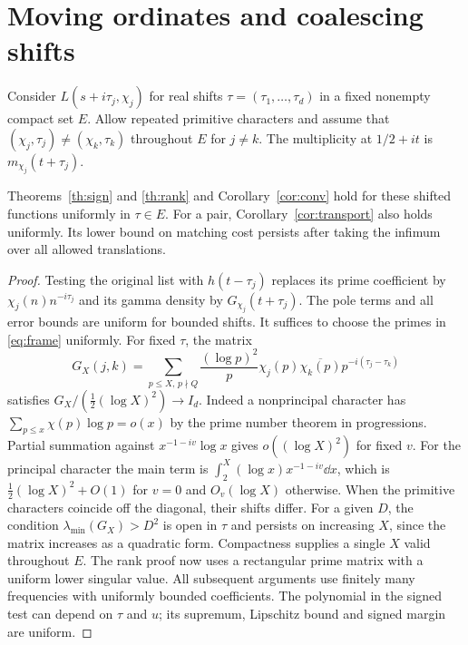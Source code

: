 \section{Moving ordinates and coalescing shifts}\label{sec:moving}

Consider $L(s+i\tau_j,\chi_j)$ for real shifts $\tau=(\tau_1,\ldots,\tau_d)$
in a fixed nonempty compact set $E$. Allow repeated primitive characters
and assume that $(\chi_j,\tau_j)\ne(\chi_k,\tau_k)$ throughout $E$ for
$j\ne k$. The multiplicity at $1/2+it$ is $m_{\chi_j}(t+\tau_j)$.

\begin{theorem}\label{th:moving}
Theorems~\ref{th:sign} and \ref{th:rank} and Corollary~\ref{cor:conv}
hold for these shifted functions uniformly in $\tau\in E$. For a pair,
Corollary~\ref{cor:transport} also holds uniformly. Its lower bound on
matching cost persists after taking the infimum over all allowed translations.
\end{theorem}
\begin{proof}
Testing the original list with $h(t-\tau_j)$ replaces its prime coefficient
by $\chi_j(n)n^{-i\tau_j}$ and its gamma density by $G_{\chi_j}(t+\tau_j)$.
The pole terms and all error bounds are uniform for bounded shifts.
It suffices to choose the primes in \eqref{eq:frame} uniformly.
For fixed $\tau$, the matrix
\[
 G_X(j,k)=\sum_{p\le X,\,p\nmid Q}\frac{(\log p)^2}{p}
 \chi_j(p)\overline{\chi_k(p)}p^{-i(\tau_j-\tau_k)}
\]
satisfies $G_X/(\tfrac12(\log X)^2)\to I_d$. Indeed a nonprincipal
character has $\sum_{p\le x}\chi(p)\log p=o(x)$ by the prime number
theorem in progressions. Partial summation against
$x^{-1-iv}\log x$ gives $o((\log X)^2)$ for fixed $v$. For the principal
character the main term is
$\int_2^X(\log x)x^{-1-iv}\dd x$, which is
$\tfrac12(\log X)^2+O(1)$ for $v=0$ and $O_v(\log X)$ otherwise.
When the primitive characters coincide off the diagonal, their shifts differ.
For a given $D$, the condition $\lambda_{\min}(G_X)>D^2$ is open in
$\tau$ and persists on increasing $X$, since the matrix increases as a
quadratic form. Compactness supplies a single $X$ valid throughout $E$.
The rank proof now uses a rectangular prime matrix with a uniform lower
singular value. All subsequent arguments use finitely many frequencies with
uniformly bounded coefficients. The polynomial in the signed test can depend
on $\tau$ and $u$; its supremum, Lipschitz bound and signed margin are uniform.
\end{proof}

